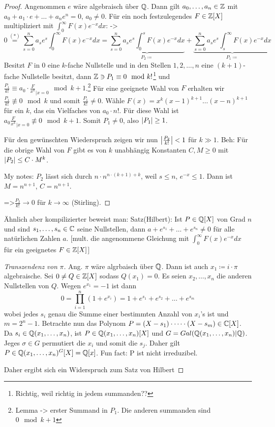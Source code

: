 \documentclass[../main.tex]{subfiles}
\begin{document}
\begin{proof}
    Angenommen $e$ wäre algebraisch über $\mathbb{Q}$.
    Dann gilt $a_0,\dots,a_n\in \mathbb{Z}$ mit $a_0+a_1\cdot e+\dots+a_n e^n = 0$, $a_0 \neq 0$.
    Für ein noch festzulegendes $F\in \mathbb{Z}[X]$ multipliziert mit $\int_0^\infty F(x)e^{-x}dx$:
    -> $$0\overset{(*)}{=} \sum_{s=0}^n a_s e^s \int_0^\infty F(x)e^{-x}dx = \underbrace{\sum_{s=0}^n a_s e^s \int_0^s F(x)e^{-x}dx}_{P_2\coloneqq} + \underbrace{\sum_{s=0}^n a_s e^s \int_s^\infty F(x) e^{-x}dx}_{P_1\coloneqq}$$
    Besitzt $F$ in 0 eine $k$-fache Nullstelle und in den Stellen $1,2,\dots,n$ eine $(k+1)$-fache Nullstelle besitzt, dann $\mathbb{Z}\ni P_1\equiv 0 \mod k!$\footnote{Richtig, weil richtig in jedem summanden??} und $\frac{P_1}{k!}\equiv a_0\cdot \frac{F}{x^k}_{|x=0} \mod k+1$.\footnote{Lemma -> erster Summand in $P_1$. Die anderen summanden sind $0 \mod k+1$}
    Für eine geeignete Wahl von $F$ erhalten wir $\frac{P_1}{k!}\not\equiv 0\mod k$ und somit $\frac{P_1}{k!} \neq 0$.
    Wähle $F(x) = x^k(x-1)^{k+1}\dots (x-n)^{k+1}$ für ein $k$, das ein Vielfaches von $a_0\cdot n!$.
    Für diese Wahl ist $a_0\frac{F}{x^k}_{|x=0}\not\equiv 0 \mod k+1$.
    Somit $P_1\neq 0$, also $\left\vert P_1 \right\vert\geq 1$.

    Für den gewünschten Wiederspruch zeigen wir nun  $\left\vert \frac{P_2}{k!} \right\vert<1$ für $k \gg 1$.
    Beh: Für die obrige Wahl von $F$ gibt es von $k$ unabhängig Konstanten $C,M\geq 0$ mit $\left\vert P_2 \right\vert \leq C\cdot M^k$.

    My notes: $P_2$ lässt sich durch $n\cdot n^{n\cdot (k+1)+k}$, weil $s\leq n$, $e^{-x} \leq 1$.
    Dann ist $M = n^{n+1}$, $C=n^{n+1}$.
    
    =>$\frac{P_2}{k!}\rightarrow 0$ für $k\rightarrow \infty$ (Stirling)\Lightning.
\end{proof}
Ähnlich aber kompilizierter beweist man:
Satz(Hilbert): Ist $P\in\mathbb{Q}[X]$ von Grad $n$ und sind $s_1,\dots,s_n\in \mathbb{C}$ seine Nullstellen, dann $a+e^{s_1}+\dots + e^{s_n}\neq 0$ für alle natürlichen Zahlen $a$.
[mult. die angenommene Gleichung mit $\int_0^\infty F(x)e^{-x}dx$ für ein geeignetes $F\in \mathbb{Z}[X]$]

\begin{proof}[Transzendenz von $\pi$]
    Ang. $\pi$ wäre algrbaisch über $\mathbb{Q}$.
    Dann ist auch $x_1\coloneqq i\cdot \pi$ algebraische.
    Sei $0\neq Q\in \mathbb{Z}[X]$ sodass $Q(x_1) = 0$.
    Es seien $x_2,\dots,x_n$ die anderen Nullstellen von $Q$.
    Wegen $e^{x_1} = -1$ ist dann $$0 = \prod_{i=1}^n (1+e^{x_i}) = 1 + e^{s_1} + e^{s_2}+\dots +e^{s_m}$$
    wobei jedes $s_i$ genau die Summe einer bestimmten Anzahl von $x_i$'s ist und $m = 2^n-1$.
    Betrachte nun das Polynom $P = (X-s_1)\cdot\dots\cdot (X-s_m)\in \mathbb{C}[X]$.
    Da $s_i\in \mathbb{Q}(x_1,\dots,x_n)$, ist $P\in\mathbb{Q}(x_1,\dots,x_n)[X]$ und $G=Gal(\mathbb{Q}(x_1,\dots,x_n)|\mathbb{Q})$.
    Jeges $\sigma \in G$ permutiert die $x_i$ und somit die $s_j$.
    Daher gilt $P\in \mathbb{Q}(x_1,\dots,x_n)^G[X] = \mathbb{Q}[x]$.
    Fun fact: P ist nicht irreduzibel.

    Daher ergibt sich ein Widerspruch zum Satz von Hilbert
\end{proof}
\end{document}
